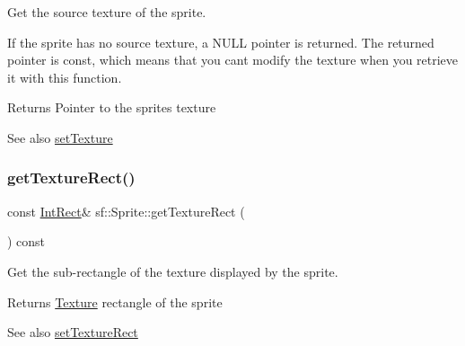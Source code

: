 Get the source texture of the sprite. 

If the sprite has no source texture, a N\+U\+LL pointer is returned. The returned pointer is const, which means that you can\textquotesingle{}t modify the texture when you retrieve it with this function.

\begin{DoxyReturn}{Returns}
Pointer to the sprite\textquotesingle{}s texture
\end{DoxyReturn}
\begin{DoxySeeAlso}{See also}
\mbox{\hyperlink{classsf_1_1_sprite_a3729c88d88ac38c19317c18e87242560}{set\+Texture}} \begin{DoxyVerb}\end{DoxyVerb}
 
\end{DoxySeeAlso}
\mbox{\label{classsf_1_1_sprite_a3492896fe7b63f58ae022c5b8bec5c98}} 
\subsubsection{\texorpdfstring{getTextureRect()}{getTextureRect()}}
{\footnotesize\ttfamily const \mbox{\hyperlink{classsf_1_1_rect}{Int\+Rect}}\& sf\+::\+Sprite\+::get\+Texture\+Rect (\begin{DoxyParamCaption}{ }\end{DoxyParamCaption}) const}



Get the sub-\/rectangle of the texture displayed by the sprite. 

\begin{DoxyReturn}{Returns}
\mbox{\hyperlink{classsf_1_1_texture}{Texture}} rectangle of the sprite
\end{DoxyReturn}
\begin{DoxySeeAlso}{See also}
\mbox{\hyperlink{classsf_1_1_sprite_a3fefec419a4e6a90c0fd54c793d82ec2}{set\+Texture\+Rect}} \begin{DoxyVerb}\end{DoxyVerb}
 
\end{DoxySeeAlso}
\mbox{\label{classsf_1_1_sprite_a14def44da6437bfea20c4df5e71aba4c}} 
